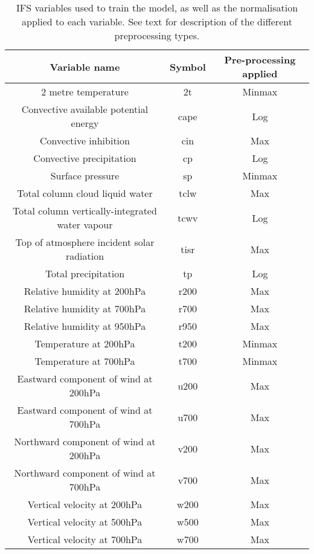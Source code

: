 \documentclass[../main.tex]{subfiles}
\begin{document}
\begin{table}[ht!]
\centering
\begin{tabular}{c | c | c } 
 \hline
 Variable name & Symbol & Pre-processing applied \\ [0.5ex] 
 \hline\hline
 2 metre temperature &2t & Minmax  \\
 Convective available potential energy &cape & Log \\
 Convective inhibition &cin & Max \\
Convective precipitation &cp & Log \\
Surface pressure & sp & Minmax  \\
Total column cloud liquid water &tclw & Max \\
Total column vertically-integrated water vapour&tcwv & Log \\
Top of atmosphere incident solar radiation&tisr & Max \\
Total precipitation &tp & Log \\
Relative humidity at 200hPa  &r200 & Max \\
Relative humidity at 700hPa  &r700 & Max \\
Relative humidity at 950hPa  &r950 & Max \\
Temperature at 200hPa &t200 & Minmax \\
Temperature at 700hPa  &t700 & Minmax \\
Eastward component of wind at 200hPa &u200 & Max \\
Eastward component of wind at 700hPa &u700 & Max \\
Northward component of wind at 200hPa&v200 & Max \\
Northward component of wind at 700hPa &v700 & Max \\
Vertical velocity at 200hPa &w200 & Max \\
Vertical velocity at 500hPa &w500 & Max \\
Vertical velocity at 700hPa &w700 & Max \\
 \hline
\end{tabular}

\caption{IFS variables used to train the model, as well as the normalisation applied to each variable. See text for description of the different preprocessing types.}
\label{tab:vars}
\end{table}



     

\ifSubfilesClassLoaded{%
    
    

}{}
\end{document}
